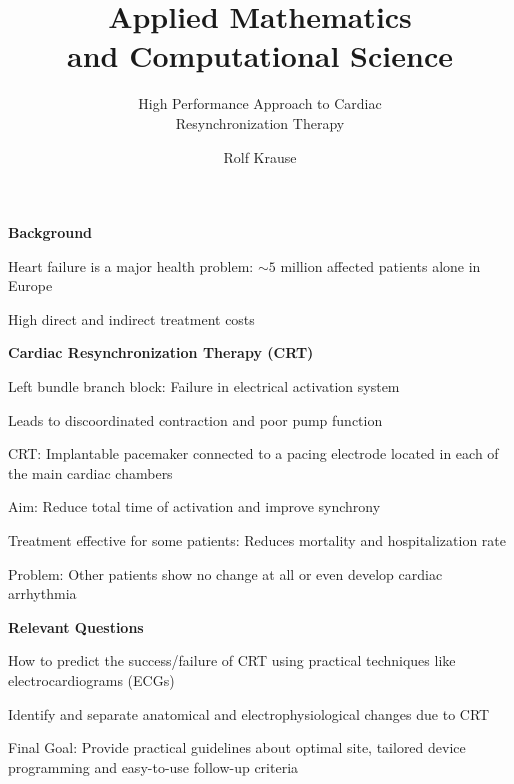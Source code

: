 \documentclass[20pt]{ICSPoster}
\title{Applied Mathematics\\[0.2cm]and Computational Science}
\subtitle{High Performance Approach to Cardiac\\ Resynchronization Therapy}
\author{Rolf Krause}
\begin{document}
  \maketitle %

  \begin{posterbox}[2]
    \begin{headerbox}[
        title=Background: Understanding Cardiac Resynchronization Therapy,
        height=0.25\textheight,
        width=0.47\textwidth]
      \begin{minipage}{\textwidth}\sf
        \textbf{Background}
        \vspace{1mm}
        \begin{compactitem}
          \item Heart failure is a major health problem: $\sim 5$ million affected patients alone in Europe
          \item High direct and indirect treatment costs
        \end{compactitem}
      \end{minipage}

      \vspace{0.5cm}

      \begin{minipage}{0.55\textwidth}\sf
        \textbf{Cardiac Resynchronization Therapy (CRT)}
        \begin{compactitem}
          \item Left bundle branch block: Failure in electrical activation system
          \item Leads to discoordinated contraction and poor pump function
          \item CRT: Implantable pacemaker connected to a pacing electrode
                located in each of the main cardiac chambers
          \item Aim: Reduce total time of activation and improve synchrony
          \item Treatment effective for some patients: Reduces mortality and hospitalization rate
          \item Problem: Other patients show no change at all or even develop cardiac arrhythmia
        \end{compactitem}

        \vspace{0.5cm}

        \textbf{Relevant Questions}
        \begin{compactitem}
          \item How to predict the success/failure of CRT using practical techniques like electrocardiograms (ECGs)
          \item Identify and separate anatomical and electrophysiological changes due to CRT
          \item Final Goal: Provide practical guidelines about optimal site, tailored device programming
                and easy-to-use follow-up criteria
        \end{compactitem}


\end{minipage}
\end{headerbox}
\end{posterbox}
\end{document}
